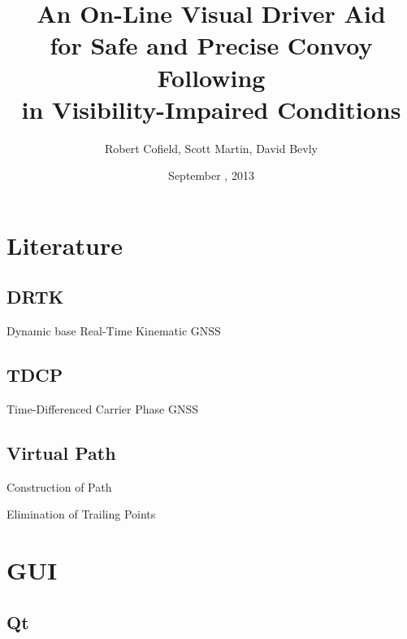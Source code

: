 \documentclass{beamer}
\title[DRTK Driver Assistance]{An On-Line Visual Driver Aid\\ for Safe and Precise Convoy Following\\ in Visibility-Impaired Conditions}
\author[]{Robert Cofield, Scott Martin, David Bevly}
\date{September , 2013}
\begin{document}
\frame{\titlepage}

\section{Literature}

  \subsection{DRTK}

    \begin{frame}{Dynamic base Real-Time Kinematic GNSS}
    \end{frame}

  \subsection{TDCP}

    \begin{frame}{Time-Differenced Carrier Phase GNSS}
    \end{frame}

  \subsection{Virtual Path}

    \begin{frame}{Construction of Path}
    \end{frame}

    \begin{frame}{Elimination of Trailing Points}
    \end{frame}


\section{GUI}

  \subsection{Qt}
\end{document}
